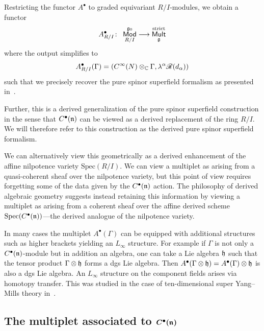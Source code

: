 \documentclass[11pt]{article}
\numberwithin{equation}{section}
\numberwithin{equation}{section}
\def\cat#1{\ensuremath{\mathsf{#1}}}
\DeclareMathOperator{\Mod}{\cat{Mod}}
\DeclareMathOperator{\Mult}{\cat{Mult}}
\def\sR{\mathscr R}
\begin{document}
Restricting the functor $A^\bullet$ to graded equivariant $R/I$-modules, we obtain a functor
\begin{equation*}
A^\bullet_{R/I} \colon \ \Mod_{R/I}^{\fg_0} \longrightarrow \Mult_{\fg}^{\mathrm{strict}}
\end{equation*}
where the output simplifies to
\begin{equation*}
A^\bullet_{R/I} (\Gamma) = \left( C^\infty(N) \otimes_\CC \Gamma , \lambda^\alpha \sR(d_\alpha) \right)
\end{equation*}
such that we precisely recover the pure spinor superfield formalism as presented in~\cite{perspectives}.

Further, this is a derived generalization of the pure spinor superfield construction in the sense that $C^\bullet(\mathfrak n)$ can be viewed as a derived replacement of the ring $R/I$. We will therefore refer to this construction as the derived pure spinor superfield formalism.

\begin{rmk}
	We can alternatively view this geometrically as a derived enhancement of the affine nilpotence variety $\mathrm{Spec}(R/I)$. We can view a multiplet as arising from a quasi-coherent sheaf over the nilpotence variety, but this point of view requires forgetting some of the data given by the $C^\bullet(\mathfrak n)$ action. The philosophy of derived algebraic geometry suggests instead retaining this information by viewing a multiplet as arising from a coherent sheaf over the affine derived scheme $\mathrm{Spec}(C^\bullet(\mathfrak n))$---the derived analogue of the nilpotence variety.
\end{rmk}

\begin{rmk}
	In many cases the multiplet $A^\bullet(\Gamma)$ can be equipped with additional structures such as higher brackets yielding an $L_\infty$ structure. For example if $\Gamma$ is not only a $C^\bullet(\mathfrak n)$-module but in addition an algebra, one can take a Lie algebra $\mathfrak h$ such that the tensor product $\Gamma \otimes \mathfrak h$ forms a dgs Lie algebra. Then $A^\bullet(\Gamma \otimes \mathfrak h) = A^\bullet(\Gamma) \otimes \mathfrak h$ is also a dgs Lie algebra. An $L_\infty$ structure on the component fields arises via homotopy transfer. This was studied in the case of ten-dimensional super Yang--Mills theory in~\cite{AKLL, perspectives}.
\end{rmk}

\subsection[The multiplet associated to C\^{}bullet(n)]{The multiplet associated to $\boldsymbol{C^\bullet(\mathfrak n)}$} \label{sec: forms}
\end{document}
